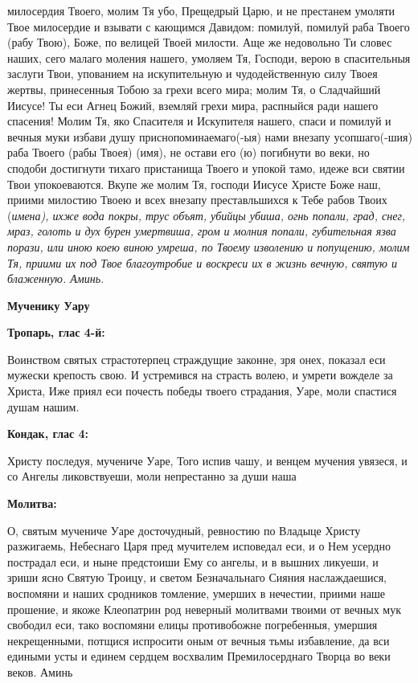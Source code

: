 милосердия Твоего, молим Тя убо, Прещедрый Царю, и не престанем умоляти Твое милосердие и взывати с кающимся Давидом: помилуй, помилуй раба Твоего (рабу Твою), Боже, по велицей Твоей милости. Аще же недовольно Ти словес наших, сего малаго моления нашего, умоляем Тя, Господи, верою в спасительныя заслуги Твои, упованием на искупительную и чудодейственную силу Твоея жертвы, принесенныя Тобою за грехи всего мира; молим Тя, о Сладчайший Иисусе! Ты еси Агнец Божий, вземляй грехи мира, распныйся ради нашего спасения! Молим Тя, яко Спасителя и Искупителя нашего, спаси и помилуй и вечныя муки избави душу приснопоминаемаго(-ыя) нами внезапу усопшаго(-шия) раба Твоего (рабы Твоея) (имя), не остави его (ю) погибнути во веки, но сподоби достигнути тихаго пристанища Твоего и упокой тамо, идеже вси святии Твои упокоеваются. Вкупе же молим Тя, господи Иисусе Христе Боже наш, приими милостию Твоею и всех внезапу преставльшихся к Тебе рабов Твоих (\itshape имена\normalfont{}), ихже вода покры, трус объят, убийцы убиша, огнь попали, град, снег, мраз, голоть и дух бурен умертвиша, гром и молния попали, губительная язва порази, или иною коею виною умреша, по Твоему изволению и попущению, молим Тя, приими их под Твое благоутробие и воскреси их в жизнь вечную, святую и блаженную. Аминь.


\mychapterending

 


\medskip


\bfseries Мученику Уару\normalfont{}


\bfseries Тропарь, глас 4-й:\normalfont{}


Воинством святых страстотерпец страждущие законне, зря онех, показал еси мужески крепость свою. И устремився на страсть волею, и умрети вожделе за Христа, Иже приял еси почесть победы твоего страдания, Уаре, моли спастися душам нашим.


\medskip


\bfseries Кондак, глас 4:\normalfont{}


Христу последуя, мучениче Уаре, Того испив чашу, и венцем мучения увязеся, и со Ангелы ликовствуеши, моли непрестанно за души наша


\medskip


\bfseries Молитва:\normalfont{}


О, святым мучениче Уаре досточудный, ревностию по Владыце Христу разжигаемь, Небеснаго Царя пред мучителем исповедал еси, и о Нем усердно пострадал еси, и ныне предстоиши Ему со ангелы, и в вышних ликуеши, и зриши ясно Святую Троицу, и светом Безначальнаго Сияния наслаждаешися, воспомяни и наших сродников томление, умерших в нечестии, приими наше прошение, и якоже Клеопатрин род неверный молитвами твоими от вечных мук свободил еси, тако воспомяни елицы противобожне погребенныя, умершия некрещенными, потщися испросити оным от вечныя тьмы избавление, да вси едиными усты и единем сердцем восхвалим Премилосерднаго Творца во веки веков. Аминь


